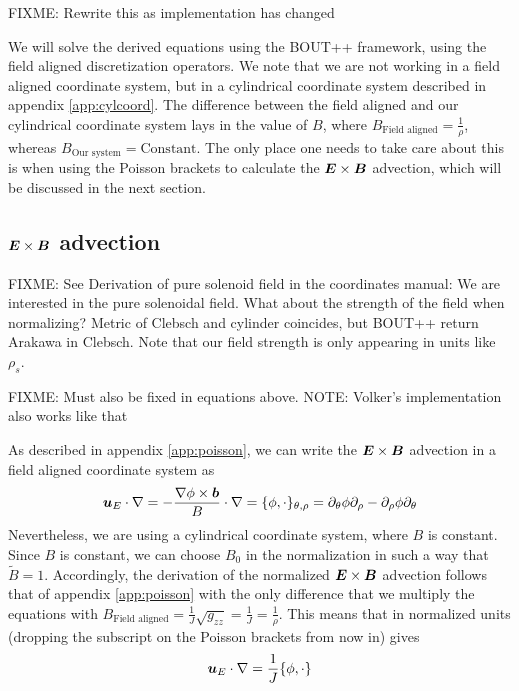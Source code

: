 %
FIXME: Rewrite this as implementation has changed

%
We will solve the derived equations using the BOUT++ framework, using the field
aligned discretization operators. We note that we are not working in a field
aligned coordinate system, but in a cylindrical coordinate system described in
appendix \ref{app:cylcoord}. The difference between the field aligned and our
cylindrical coordinate system lays in the value of $B$, where $B_\text{Field
    aligned}=\frac{1}{\rho}$, whereas $B_\text{Our system}=\text{Constant}$.
The only place one needs to take care about this is when using the Poisson
brackets to calculate the $\boldsymbol{E}\times \boldsymbol{B}$ advection, which will be
discussed in the next section.

\subsection{\texorpdfstring{$\boldsymbol{E}\times \boldsymbol{B}$}{ExB} advection}
\label{sec:ExBadv}
FIXME: See Derivation of pure solenoid field in the coordinates manual: We are
interested in the pure solenoidal field. What about the strength of the field
when normalizing? Metric of Clebsch and cylinder coincides, but BOUT++ return
Arakawa in Clebsch. Note that our field strength is only appearing in units
like $\rho_s$.

FIXME: Must also be fixed in equations above. NOTE: Volker's implementation
also works like that

As described in appendix \ref{app:poisson}, we can write the
$\boldsymbol{E}\times\boldsymbol{B}$ advection in a field aligned coordinate system as
%
\begin{align}
    \boldsymbol{u}_E\cdot\nabla
    = -\frac{\nabla\phi\times\boldsymbol{b}}{B}\cdot\nabla
    = \{\phi, \cdot\}_{\theta,\rho}
    = \partial_\theta\phi\partial_\rho - \partial_\rho\phi\partial_\theta
    \label{eq:non_norm_adv}
\end{align}
%
Nevertheless, we are using a cylindrical coordinate system, where $B$ is
constant.  Since $B$ is constant,
we can choose $B_0$ in the normalization in such a way that $\widetilde{B}=1$.
Accordingly, the derivation of the normalized $\boldsymbol{E}\times \boldsymbol{B}$ advection
follows that of appendix \ref{app:poisson} with the only difference that we
multiply the equations with
$B_\text{Field aligned}=\frac{1}{J}\sqrt{g_{zz}}=\frac{1}{J}=\frac{1}{\rho}$.
This means that in normalized units (dropping the subscript on the Poisson
brackets from now in) gives
%
\begin{align*}
    \boldsymbol{u}_E\cdot\nabla = \frac{1}{J}\{\phi, \cdot\}
\end{align*}


